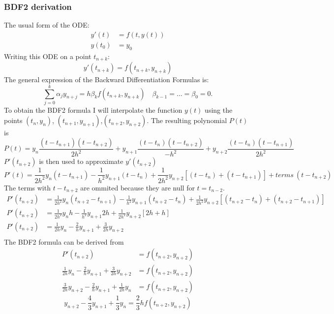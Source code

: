 \documentclass[a4paper, 11pt]{article}
\begin{document}
			\subsubsection*{BDF2 derivation}
				The usual form of the ODE:
				\begin{align}
					y'(t) &= f(t, y(t)) \\
					y(t_0) &= y_0
				\end{align}
				Writing this ODE on a point $t_{n+k}$:
				\begin{equation}
					y'(t_{n+k}) = f(t_{n+k}, y_{n+k}) 
				\end{equation}
				The general expression of the Backward Differentiation Formulas is:
				\begin{equation}
					\sum_{j=0}^{k}\alpha_j y_{n+j} = h \beta_k f(t_{n+k}, y_{n+k}) \quad \beta_{k-1} = \ldots = \beta_0 = 0.
				\end{equation}
				To obtain the BDF2 formula I will interpolate the function $y(t)$ using the points $(t_{n}, y_{n})$, $(t_{n+1}, y_{n+1})$,$(t_{n+2}, y_{n+2})$.
				The resulting polynomial $P(t)$ is
				\begin{equation}
					P(t) = y_n \frac{(t - t_{n+1})(t - t_{n+2})}{2h^2} + y_{n+1} \frac{(t - t_n)(t - t_{n+2})}{-h^2} + y_{n+2} \frac{(t - t_n)(t - t_{n+1})}{2h^2}
				\end{equation}
				$P'(t_{n+2})$ is then used to approximate $y'(t_{n+2})$
				\begin{equation}
					P'(t) = \frac{1}{2h^2} y_n(t-t_{n+1}) - \frac{1}{h^2} y_{n+1}(t-t_{n}) + \frac{1}{2h^2} y_{n+2}[(t-t_{n})+(t-t_{n+1})] + terms \ (t-t_{n+2})
				\end{equation}
				The terms with $t-t_{n+2}$ are ommited because they are null for $t = t_{n-2}$.
				\begin{align}
					P'(t_{n+2}) &= \frac{1}{2h^2} y_n(t_{n+2}-t_{n+1}) - \frac{1}{h^2} y_{n+1}(t_{n+2}-t_{n}) + \frac{1}{2h^2} y_{n+2}[(t_{n+2}-t_{n})+(t_{n+2}-t_{n+1})] \\
					P'(t_{n+2}) &= \frac{1}{2h^2} y_n h - \frac{1}{h^2} y_{n+1} 2h + \frac{1}{2h^2} y_{n+2}[2h+h] \\
					P'(t_{n+2}) &= \frac{1}{2h} y_n - \frac{2}{h} y_{n+1} + \frac{3}{2h} y_{n+2} \\
				\end{align}
				The BDF2 formula can be derived from
				\begin{align}
					P'(t_{n+2}) &= f(t_{n+2},y_{n+2}) \\
					\frac{1}{2h} y_n - \frac{2}{h} y_{n+1} + \frac{3}{2h} y_{n+2} &=  f(t_{n+2},y_{n+2}) \\
					\frac{3}{2h} y_{n+2} - \frac{2}{h} y_{n+1} + \frac{1}{2h} y_n &=  f(t_{n+2},y_{n+2})
				\end{align}
				\begin{equation}
					y_{n+2} - \frac{4}{3} y_{n+1} + \frac{1}{3} y_n = \frac{2}{3} h f(t_{n+2},y_{n+2}) 
				\end{equation}
			
\end{document}
